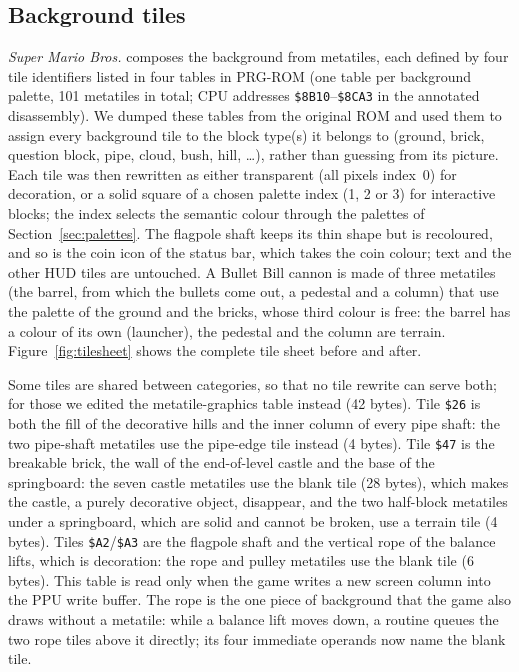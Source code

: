\documentclass{article}
\newcommand{\hex}[1]{\texttt{\$#1}}
\begin{document}
\subsection{Background tiles}
\label{sec:bg}

\textit{Super Mario Bros.} composes the background from metatiles, each defined by four tile
identifiers listed in four tables in PRG-ROM (one table per background palette, 101 metatiles in
total; CPU addresses \hex{8B10}--\hex{8CA3} in the annotated disassembly\cite{smbdis}). We dumped
these tables from the original ROM and used them to assign every background tile to the block
type(s) it belongs to (ground, brick, question block, pipe, cloud, bush, hill, \ldots), rather
than guessing from its picture. Each tile was then rewritten as either transparent (all pixels
index~0) for decoration, or a solid square of a chosen palette index (1, 2 or 3) for interactive
blocks; the index selects the semantic colour through the palettes of Section~\ref{sec:palettes}.
The flagpole shaft keeps its thin shape but is recoloured, and so is the coin icon of the status
bar, which takes the coin colour; text and the other HUD tiles are untouched. A Bullet Bill cannon
is made of three metatiles (the barrel, from which the bullets come out, a pedestal and a column)
that use the palette of the ground and the bricks, whose third colour is free: the barrel has a
colour of its own (launcher), the pedestal and the column are terrain.
Figure~\ref{fig:tilesheet} shows the complete tile sheet before and after.

Some tiles are shared between categories, so that no tile rewrite can serve both; for those we
edited the metatile-graphics table instead (42 bytes). Tile \hex{26} is both the fill of the
decorative hills and the inner column of every pipe shaft: the two pipe-shaft metatiles use the
pipe-edge tile instead (4 bytes). Tile \hex{47} is the breakable brick, the wall of the
end-of-level castle and the base of the springboard: the seven castle metatiles use the blank tile
(28 bytes), which makes the castle, a purely decorative object, disappear, and the two half-block
metatiles under a springboard, which are solid and cannot be broken, use a terrain tile (4 bytes).
Tiles \hex{A2}/\hex{A3} are the flagpole shaft and the vertical rope of the balance lifts, which is
decoration: the rope and pulley metatiles use the blank tile (6 bytes). This table is read only
when the game writes a new screen column into the PPU write buffer. The rope is the one piece of
background that the game also draws without a metatile: while a balance lift moves down, a routine
queues the two rope tiles above it directly; its four immediate operands now name the blank tile.
\end{document}
